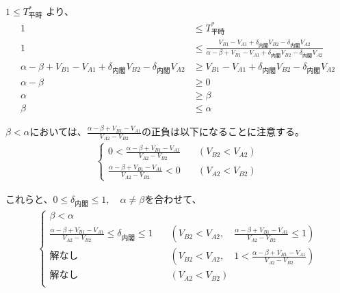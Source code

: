 \documentclass[main.tex]{subfiles}
\begin{document}
$1 \le T^*_{平時}$ より、
\begin{align*}
    1 &\le T^*_{平時}  \\
    1 &\le \frac{ V_{B1} - V_{A1} +\delta_{内閣}V_{B2} - \delta_{内閣}V_{A2} }{ \alpha-\beta + V_{B1}-V_{A1} + \delta_{内閣}V_{B2} - \delta_{内閣}V_{A2} }\\[1em]
    \alpha-\beta + V_{B1}-V_{A1} + \delta_{内閣}V_{B2} - \delta_{内閣}V_{A2}  &\ge V_{B1} - V_{A1} +\delta_{内閣}V_{B2} - \delta_{内閣}V_{A2} \\[1em]
    \alpha - \beta &\ge 0\\
    \alpha &\ge \beta \\
    \beta &\le \alpha
\end{align*}


$\beta < \alpha$においては、$\frac{\alpha-\beta + V_{B1}-V_{A1}}{V_{A2} - V_{B2}}$の正負は以下になることに注意する。
\begin{align*}
    \begin{cases}
        0 < \frac{\alpha-\beta + V_{B1}-V_{A1}}{V_{A2} - V_{B2}} \quad&(V_{B2} < V_{A2})\\[1em]
        \frac{\alpha-\beta + V_{B1}-V_{A1}}{V_{A2} - V_{B2}} < 0 \quad&(V_{A2} < V_{B2})
    \end{cases}
\end{align*}


これらと、$0 \le \delta_{内閣} \le 1, \quad \alpha ≠ \beta$を合わせて、
\begin{align*}
\begin{cases}
    \beta < \alpha \\[1em]
    \frac{\alpha-\beta + V_{B1}-V_{A1}}{V_{A2} - V_{B2}} \le \delta_{内閣} \le 1  \quad &( V_{B2} < V_{A2} ,\quad \frac{\alpha-\beta + V_{B1}-V_{A1}}{V_{A2} - V_{B2}} \le 1) \\[1em]
    解なし  \quad &( V_{B2} < V_{A2} ,\quad 1 < \frac{\alpha-\beta + V_{B1}-V_{A1}}{V_{A2} - V_{B2}}) \\[1em]
    解なし \quad &( V_{A2} < V_{B2} )\\[1em]
\end{cases}
\end{align*}
\end{document}
